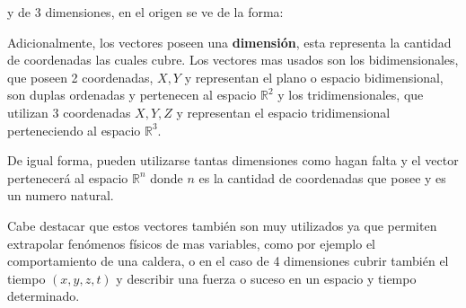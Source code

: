 y de 3 dimensiones, en el origen se ve de la forma:






    Adicionalmente, los vectores poseen una \textbf{dimensión}, esta representa
    la cantidad de coordenadas las cuales cubre. Los vectores mas usados son
    los bidimensionales, que poseen 2 coordenadas, $X,Y$ y representan el plano
    o espacio bidimensional, son duplas ordenadas y pertenecen al espacio
    $\mathbb{R}^2$ y los tridimensionales, que utilizan 3 coordenadas $X,Y,Z$ y
    representan el espacio tridimensional perteneciendo al espacio
    $\mathbb{R}^3$.

    De igual forma, pueden utilizarse tantas dimensiones como hagan falta y el
    vector pertenecerá al espacio $\mathbb{R}^n$ donde $n$ es la cantidad de
    coordenadas que posee y es un numero natural.

    Cabe destacar que estos vectores también son muy utilizados ya que permiten
    extrapolar fenómenos físicos de mas variables, como por ejemplo el
    comportamiento de una caldera, o en el caso de 4 dimensiones cubrir también
    el tiempo $(x,y,z,t)$ y describir una fuerza o suceso en un espacio y
    tiempo determinado.

